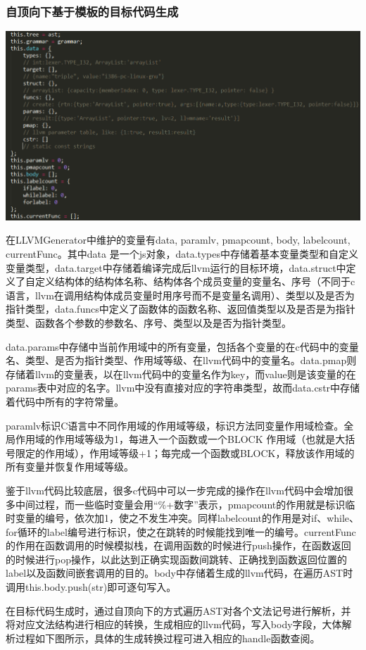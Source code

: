 \documentclass[a4paper]{article}
\begin{document}
\begin{CJK*}{UTF8}{gbsn}
    \subsubsection{自顶向下基于模板的目标代码生成}
    \begin{center}
    \includegraphics[width=6in]{param.png}
    \end{center}
    
    在LLVMGenerator中维护的变量有data, paramlv, pmapcount, body, labelcount, currentFunc。其中data 是一个js对象，data.types中存储着基本变量类型和自定义变量类型，data.target中存储着编译完成后llvm运行的目标环境，data.struct中定义了自定义结构体的结构体名称、结构体各个成员变量的变量名、序号（不同于c语言，llvm在调用结构体成员变量时用序号而不是变量名调用）、类型以及是否为指针类型，data.funcs中定义了函数体的函数名称、返回值类型以及是否是为指针类型、函数各个参数的参数名、序号、类型以及是否为指针类型。
	\par data.params中存储中当前作用域中的所有变量，包括各个变量的在c代码中的变量名、类型、是否为指针类型、作用域等级、在llvm代码中的变量名。data.pmap则存储着llvm的变量表，以在llvm代码中的变量名作为key，而value则是该变量的在params表中对应的名字。llvm中没有直接对应的字符串类型，故而data.cstr中存储着代码中所有的字符常量。

	\par paramlv标识C语言中不同作用域的作用域等级，标识方法同变量作用域检查。全局作用域的作用域等级为1，每进入一个函数或一个BLOCK 作用域（也就是大括号限定的作用域），作用域等级+1；每完成一个函数或BLOCK，释放该作用域的所有变量并恢复作用域等级。
	\par 鉴于llvm代码比较底层，很多c代码中可以一步完成的操作在llvm代码中会增加很多中间过程，而一些临时变量会用“\%+数字”表示，pmapcount的作用就是标识临时变量的编号，依次加1，使之不发生冲突。同样labelcount的作用是对if、while、for循环的label编号进行标识，使之在跳转的时候能找到唯一的编号。currentFunc的作用在函数调用的时候模拟栈，在调用函数的时候进行push操作，在函数返回的时候进行pop操作，以此达到正确实现函数间跳转、正确找到函数返回位置的label以及函数间嵌套调用的目的。body中存储着生成的llvm代码，在遍历AST时调用this.body.push(str)即可逐句写入。
	\par 在目标代码生成时，通过自顶向下的方式遍历AST对各个文法记号进行解析，并将对应文法结构进行相应的转换，生成相应的llvm代码，写入body字段，大体解析过程如下图所示，具体的生成转换过程可进入相应的handle函数查阅。


\end{CJK*}
\end{document}
